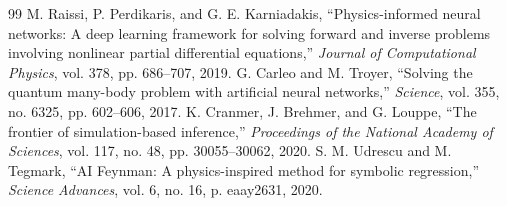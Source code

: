 \documentclass[11pt,a4paper]{article}
\begin{document}
\begin{thebibliography}{99}
 M. Raissi, P. Perdikaris, and G. E. Karniadakis, ``Physics-informed neural networks: A deep learning framework for solving forward and inverse problems involving nonlinear partial differential equations,'' \textit{Journal of Computational Physics}, vol. 378, pp. 686--707, 2019.
 G. Carleo and M. Troyer, ``Solving the quantum many-body problem with artificial neural networks,'' \textit{Science}, vol. 355, no. 6325, pp. 602--606, 2017.
 K. Cranmer, J. Brehmer, and G. Louppe, ``The frontier of simulation-based inference,'' \textit{Proceedings of the National Academy of Sciences}, vol. 117, no. 48, pp. 30055--30062, 2020.
 S. M. Udrescu and M. Tegmark, ``AI Feynman: A physics-inspired method for symbolic regression,'' \textit{Science Advances}, vol. 6, no. 16, p. eaay2631, 2020.
\end{thebibliography}
\end{document}
